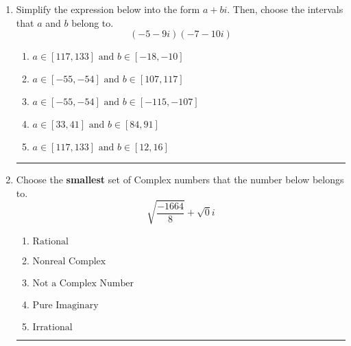 \documentclass[14pt]{extbook}
\newcommand{\litem}[1]{\item#1\hspace*{-1cm}\rule{\textwidth}{0.4pt}}
\begin{document}
\begin{enumerate}
{\begin{enumerate}[label=\Alph*.]
\end{enumerate} }
\litem{
Simplify the expression below into the form $a+bi$. Then, choose the intervals that $a$ and $b$ belong to.\[ (-5 - 9 i)(-7 - 10 i) \]\begin{enumerate}[label=\Alph*.]
\item \( a \in [117, 133] \text{ and } b \in [-18, -10] \)
\item \( a \in [-55, -54] \text{ and } b \in [107, 117] \)
\item \( a \in [-55, -54] \text{ and } b \in [-115, -107] \)
\item \( a \in [33, 41] \text{ and } b \in [84, 91] \)
\item \( a \in [117, 133] \text{ and } b \in [12, 16] \)

\end{enumerate} }
\litem{
Choose the \textbf{smallest} set of Complex numbers that the number below belongs to.\[ \sqrt{\frac{-1664}{8}}+\sqrt{0}i \]\begin{enumerate}[label=\Alph*.]
\item \( \text{Rational} \)
\item \( \text{Nonreal Complex} \)
\item \( \text{Not a Complex Number} \)
\item \( \text{Pure Imaginary} \)
\item \( \text{Irrational} \)

\end{enumerate} }
\end{enumerate}
\end{document}
